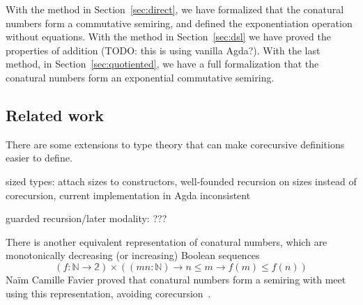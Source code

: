 With the method in Section~\ref{sec:direct}, we have formalized that the
conatural numbers form a commutative semiring, and defined the exponentiation
operation without equations. With the method in Section~\ref{sec:dsl} we have
proved the properties of addition (TODO: this is using vanilla Agda?). With the
last method, in Section~\ref{sec:quotiented}, we have a full formalization that
the conatural numbers form an exponential commutative semiring.

\subsection{Related work}

There are some extensions to type theory that can make corecursive definitions
easier to define.

sized types: attach sizes to constructors, well-founded recursion on sizes instead of
corecursion, current implementation in Agda inconsistent~\cite{hughes-sized}

guarded recursion/later modality: ???

There is another equivalent representation of conatural numbers, which are
monotonically decreasing (or increasing) Boolean sequences
\[
  (f : \mathbb{N} \to \mathbb{2}) \times ((m n : \mathbb{N}) \to n \le m \to f(m) \le f(n))
\]
Naïm Camille Favier proved that conatural numbers form a semiring with meet
using this representation, avoiding corecursion~\cite{favier-conat}.
